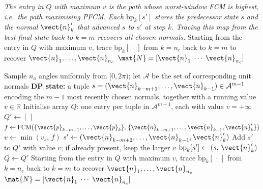 \begin{algorithm}
\begin{algorithmic}
\Statex
\Statex \textit{The entry in $Q$ with maximum $v$ is the path whose worst-window FCM is highest,}
\Statex \textit{i.e.\ the path maximising PFCM. Each $\mathrm{bp}_k[s']$ stores the predecessor state $s$}
\Statex \textit{and the normal $\vect{n}'_k$ that advanced $s$ to $s'$ at step $k$. Tracing this map}
\Statex \textit{from the best final state back to $k=m$ recovers all chosen normals.}
\State Starting from the entry in $Q$ with maximum $v$, trace $\mathrm{bp}_k[\,\cdot\,]$ from $k=n_c$ back to $k=m$ to recover $\vect{n}_1,\ldots,\vect{n}_{n_c}$
\State \Return $\mat{N}=[\vect{n}_1\;\cdots\;\vect{n}_{n_c}]$
\end{algorithmic}
\end{algorithm}

\begin{algorithm}
\caption{DP path planner — basic (maximises PFCM)}
\label{alg:dp-basic}
\begin{algorithmic}
\State Sample $n_a$ angles uniformly from $[0,2\pi)$; let $\mathcal{A}$ be the set of corresponding unit normals
\State \textbf{DP state:} a tuple $s=(\vect{n}_{k-m+1},\ldots,\vect{n}_{k-1})\in\mathcal{A}^{m-1}$ encoding the $m{-}1$ most recently chosen normals, together with a running value $v\in\mathbb{R}$
\State Initialise array $Q$: one entry per tuple in $\mathcal{A}^{m-1}$, each with value $v=+\infty$
  \State $Q'\gets[\,]$
     
      \State $f\gets\mathrm{FCM}\!\left(\{\vect{p}_{k-m+1},\ldots,\vect{p}_k\},\,\{\vect{n}_{k-m+1},\ldots,\vect{n}_{k-1},\vect{n}'_k\}\right)$
        \State $v\gets\min(v_s,\,f)$
        \State $s'\gets(\vect{n}_{k-m+2},\ldots,\vect{n}_{k-1},\vect{n}'_k)$ 
        \State Add $s'$ to $Q'$ with value $v$; if already present, keep the larger $v$
        \State $\mathrm{bp}_k[s'] \gets (s,\,\vect{n}'_k)$ 
      \EndIf
    \EndFor
  \EndFor
  \State $Q\gets Q'$
\EndFor
\State Starting from the entry in $Q$ with maximum $v$, trace $\mathrm{bp}_k[\,\cdot\,]$ from $k=n_c$ back to $k=m$ to recover $\vect{n}_1,\ldots,\vect{n}_{n_c}$
\State \Return $\mat{N}=[\vect{n}_1\;\cdots\;\vect{n}_{n_c}]$
\end{algorithmic}
\end{algorithm}

